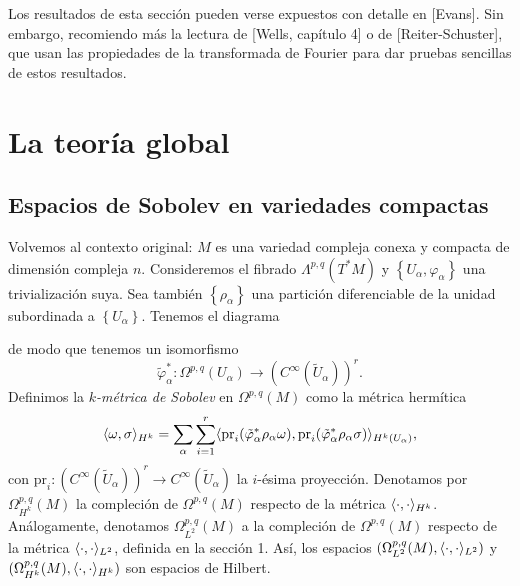 \documentclass[12pt,a4paper]{article}
\theoremstyle{definition} \newtheorem{defn}[thm]{Definición}
\theoremstyle{definition} \newtheorem{ejemplo}[thm]{Ejemplo}
\theoremstyle{definition} \newtheorem{ejercicio}[thm]{Ejercicio}
\theoremstyle{remark} \newtheorem*{obs}{Observación}
\DeclarePairedDelimiter\esc{\langle}{\rangle}
\newcommand{\CC}{\mathbb{C}}
\newcommand{\pr}{\mathrm{pr}}
\begin{document}
  Los resultados de esta sección pueden verse expuestos con detalle en [Evans]. Sin embargo, recomiendo más la lectura de [Wells, capítulo 4] o de [Reiter-Schuster], que usan las propiedades de la transformada de Fourier para dar pruebas sencillas de estos resultados.

  \section{La teoría global}
  \subsection{Espacios de Sobolev en variedades compactas}
  Volvemos al contexto original: $M$ es una variedad compleja conexa y compacta de dimensión compleja $n$. Consideremos el fibrado $\Lambda^{p,q}(T^*M)$ y $\left\{ U_\alpha, \varphi_\alpha \right\}$ una trivialización suya. Sea también $\left\{ \rho_\alpha \right\}$ una partición diferenciable de la unidad subordinada a $\left\{ U_\alpha \right\}$. Tenemos el diagrama
  \begin{center}
   \end{center}
   de modo que tenemos un isomorfismo
   \begin{equation*}
     \tilde{\varphi}_\alpha^*:\Omega^{p,q}(U_\alpha) \rightarrow (C^\infty(\tilde{U}_{\alpha}))^r.
   \end{equation*}
   Definimos la \emph{$k$-métrica de Sobolev} en $\Omega^{p,q}(M)$ como la métrica hermítica
   \begin{equation*}
     \esc{\omega,\sigma}_{H^k}=\sum_\alpha \sum_{i=1}^r \esc{\pr_i (\tilde{\varphi}_\alpha^* \rho_\alpha \omega),\pr_i(\tilde{\varphi}_\alpha^* \rho_\alpha \sigma)}_{H^k(U_\alpha)},
   \end{equation*}
   con $\pr_i: (C^\infty(\tilde{U}_\alpha))^r \rightarrow C^\infty(\tilde{U}_\alpha)$ la $i$-ésima proyección. 
   Denotamos por $\Omega^{p,q}_{H^k}(M)$ la compleción de $\Omega^{p,q}(M)$ respecto de la métrica $\esc{\cdot,\cdot}_{H^k}$. Análogamente, denotamos $\Omega^{p,q}_{L^2}(M)$ a la compleción de $\Omega^{p,q}(M)$ respecto de la métrica $\esc{\cdot,\cdot}_{L^2}$, definida en la sección 1. Así, los espacios $(\Omega^{p,q}_{L^2}(M),\esc{\cdot,\cdot}_{L^2})$ y $(\Omega^{p,q}_{H^k}(M),\esc{\cdot,\cdot}_{H^k})$ son espacios de Hilbert.
   
\end{document}
